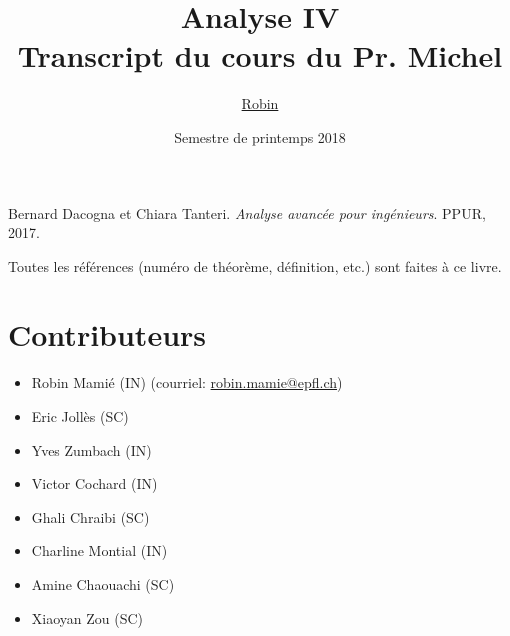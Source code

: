 \documentclass[a4paper, 11pt]{report}
\title{\textbf{Analyse IV} \\
Transcript du cours du Pr. Michel \bsc{Cibils}}
\author{\href{mailto:robin.mamie@epfl.ch}{Robin \bsc{Mamié}}}
\date{Semestre de printemps 2018
    \let\thefootnote\relax\footnotetext{Version 1.0.0 -- 2018.06.20 \hspace{1cm} \url{https://github.com/robinmamie/ba4_analyse4_notes}}}
\theoremstyle{definition}
\theoremstyle{remark}
\begin{document}
\maketitle

\tableofcontents









\begin{thebibliography}{9}
    Bernard Dacogna et Chiara Tanteri. 
    \textit{Analyse avancée pour ingénieurs}. 
    PPUR, 2017.
\end{thebibliography}

Toutes les références (numéro de théorème, définition, etc.) sont faites à ce livre.

\section*{Contributeurs}

\begin{itemize}
    \item Robin Mamié (IN) (courriel: \href{mailto:robin.mamie@epfl.ch}{robin.mamie@epfl.ch})
    \item Eric Jollès (SC)
    \item Yves Zumbach (IN)
    \item Victor Cochard (IN)
    \item Ghali Chraibi (SC)
    \item Charline Montial (IN)
    \item Amine Chaouachi (SC)
    \item Xiaoyan Zou (SC)
\end{itemize}
\end{document}

